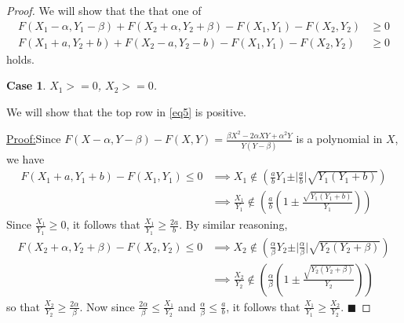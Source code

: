 \documentclass{article}
\theoremstyle{case}
\newtheorem{case}{Case}
\newenvironment{claim}[1]{\par\noindent\underline{Claim:}\space#1}{}
\newenvironment{claimproof}[1]{\par\noindent\underline{Proof:}\space#1}{\hfill $\blacksquare$}
\begin{document}
\begin{proof}
We will show that the that one of
\begin{align} \label{eq5}
F(X_1 - \alpha, Y_1 - \beta) + F(X_2 + \alpha, Y_2 + \beta) - F(X_1, Y_1) - F(X_2, Y_2) & \geq 0 \\
F(X_1 + a, Y_2 +b) + F(X_2 - a, Y_2 - b) - F(X_1, Y_1) - F(X_2, Y_2) & \geq 0
\end{align}
holds.


\begin{case} 
$X_1 >= 0$, $X_2 >= 0$. 
\end{case}
We will show that the top row in \ref{eq5} is positive.

\vspace{12pt}

\begin{claimproof}
Since $F(X - \alpha, Y - \beta) - F(X, Y) = \frac{\beta X^2 - 2\alpha XY + \alpha^2 Y}{Y\left( Y-\beta\right)}$ is a polynomial in $X$, we have
\begin{align*}
F(X_1+a, Y_1+b) - F(X_1,Y_1) \leq 0 & \implies X_1 \not \in \left( \frac{a}{b}Y_1 \pm \vert \frac{a}{b} \vert \sqrt{Y_1\left( Y_1+b\right) } \right) \\
& \implies \frac{X_1}{Y_1} \not \in \left( \frac{a}{b} \left( 1 \pm \frac{\sqrt{Y_1\left( Y_1+b\right) }}{Y_1}\right) \right)
\end{align*}
Since $\frac{X_1}{Y_1} \geq 0$, it follows that $\frac{X_1}{Y_1} \geq \frac{2a}{b}$. By similar reasoning, 
\begin{align*}
F(X_2+\alpha, Y_2+\beta) - F(X_2,Y_2) \leq 0 & \implies X_2 \not \in \left( \frac{\alpha}{\beta}Y_2 \pm \vert \frac{\alpha}{\beta} \vert \sqrt{Y_2\left( Y_2+\beta \right) } \right) \\
& \implies \frac{X_2}{Y_2} \not \in \left( \frac{\alpha}{\beta} \left( 1 \pm \frac{\sqrt{Y_2\left( Y_2+\beta \right) }}{Y_2}\right) \right)
\end{align*}
so that $\frac{X_2}{Y_2} \geq \frac{2\alpha}{\beta}$. Now since $\frac{2\alpha}{\beta} \leq \frac{X_1}{Y_2}$ and $\frac{\alpha}{\beta} \leq \frac{a}{b}$, it follows that $\frac{X_1}{Y_1} \geq \frac{X_2}{Y_2}$.
\end{claimproof}


\end{proof}
\end{document}
